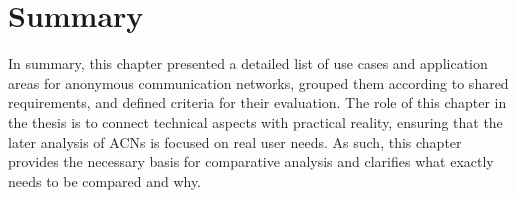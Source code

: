 \section{Summary}
In summary, this chapter presented a detailed list of use cases and application areas for anonymous communication networks, grouped them according to shared requirements, and defined criteria for their evaluation. The role of this chapter in the thesis is to connect technical aspects with practical reality, ensuring that the later analysis of ACNs is focused on real user needs. As such, this chapter provides the necessary basis for comparative analysis and clarifies what exactly needs to be compared and why.
